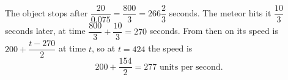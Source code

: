 The object stops after $\dfrac{20}{0.075}=\dfrac{800}{3}=266\dfrac23$ seconds. The meteor hits it $\dfrac{10}{3}$ seconds later, at time $\dfrac{800}{3}+\dfrac{10}{3}=270$ seconds. From then on its speed is $200+\dfrac{t-270}{2}$ at time $t$, so at $t=424$ the speed is
\[200+\dfrac{154}{2}=\boxed{277}\text{ units per second}.\]
